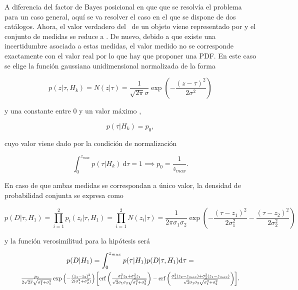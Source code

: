 A diferencia del factor de Bayes posicional en que que se resolvía el problema para un caso general, aquí se va resolver el caso en el que se dispone de dos catálogos. Ahora, el valor verdadero del \rt\ de un objeto viene representado por \maths{\tau} y el conjunto de medidas se reduce a . De nuevo, debido a que existe una incertidumbre asociada a estas medidas, el valor medido no se corresponde exactamente con el valor real por lo que hay que proponer una PDF. En este caso se elige la función gaussiana unidimensional normalizada de la forma

\begin{equation*}
    p(z|\tau,H_{k})=N(z|\tau)=\frac{1}{\sqrt{2\pi}\sigma}\exp{\left( - \frac{{\left(z-\tau \right)}^{2}}{2{\sigma}^{2}}\right)}
\end{equation*}

y una  constante entre 0 y un valor máximo ,

\begin{equation*}
    p(\tau|{H}_{k})=p_0,
\end{equation*}

cuyo valor viene dado por la condición de normalización

\begin{equation*}
    \int_0^{z_{max}}p(\tau|{H}_{k})\:\mathrm{d}\tau=1 \implies p_0=\frac{1}{z_{max}}.
\end{equation*}

En caso de que ambas medidas se correspondan a único valor, la densidad de probabilidad conjunta se expresa como

\begin{equation*}
    p(D|\tau,{H}_{1})=\prod_{i=1}^{2} p_i(z_i|\tau,H_{1})=\prod_{i=1}^{2} N(z_i|\tau) =\frac{1}{2\pi{\sigma}_{1}{\sigma}_{2}}\exp{\left(-\frac{{(\tau-z_1)}^{2}}{2{\sigma}_{1}^{2}}-\frac{{(\tau-{z}_{2})}^{2}}{2{\sigma}_{2}^{2}}\right)}
\end{equation*}

y la función verosimilitud para la hipótesis  será

\begin{multline*}
    p(D|{H}_{1})=\int_{0}^{z_{max}} p(\tau|{H}_{1})p(D|\tau,{H}_{1}) \mathrm{d}\tau=\\
    \resizebox{.9\hsize}{!}{$\frac{p_0}{2\sqrt{2\pi}\sqrt{{\sigma}_{1}^2+{\sigma}_{1}^2}}\exp{\left(-\frac{{(z_1-z_2)}^{2}}{2({\sigma}_{1}^{2}+{\sigma}_{2}^{2})}\right)}\left[ \erf{\left( \frac{{\sigma}_{1}^{2}z_2+{\sigma}_{2}^{2}z_1}{\sqrt{2}\sigma_1\sigma_2\sqrt{\sigma_1^2+\sigma_2^2}}  \right)}- \erf{\left( \frac{{\sigma}_{1}^{2}(z_2-z_{max})+\sigma_2^2(z_1-z_{max})}{\sqrt{2}\sigma_1\sigma_2\sqrt{\sigma_1^2+\sigma_2^2}}  \right)} \right]$}.
\end{multline*}


